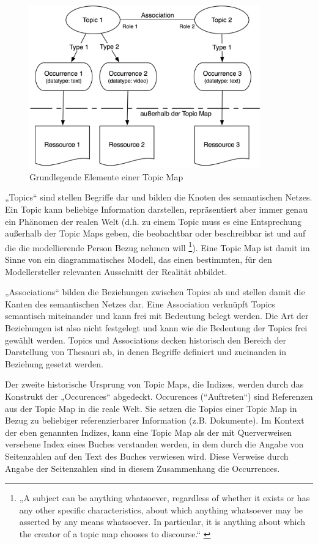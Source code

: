 \begin{figure}[htbp]
	\centering
		\includegraphics[width=10cm]{img/Persistenz/TMBasic.png}
	\caption{Grundlegende Elemente einer Topic Map}
	\label{fig:img_Persistenz_TMBasic}
\end{figure}

„Topics“ sind stellen Begriffe dar und bilden die Knoten des semantischen Netzes. Ein Topic kann beliebige Information darstellen, repräsentiert aber immer genau ein Phänomen der realen Welt (d.h. zu einem Topic muss es eine Entsprechung außerhalb der Topic Maps geben, die beobachtbar oder beschreibbar ist und auf die die modellierende Person Bezug nehmen will \footnote{„A subject can be anything whatsoever, regardless of whether it exists or has any other specific characteristics, about which anything whatsoever may be asserted by any means whatsoever. In particular, it is anything about which the creator of a topic map chooses to discourse.“ \citep[][S.8]{TMDM08}}). Eine Topic Map ist damit im Sinne von \citet{Stachowiak73} ein diagrammatisches Modell, das einen bestimmten, für den Modellersteller relevanten Ausschnitt der Realität abbildet.

„Associations“ bilden die Beziehungen zwischen Topics ab und stellen damit die Kanten des semantischen Netzes dar. Eine Association verknüpft Topics semantisch miteinander und kann frei mit Bedeutung belegt werden. Die Art der Beziehungen ist also nicht festgelegt und kann wie die Bedeutung der Topics frei gewählt werden. Topics und Associations decken historisch den Bereich der Darstellung von Thesauri ab, in denen Begriffe definiert und zueinanden in Beziehung gesetzt werden. 

Der zweite historische Ursprung von Topic Maps, die Indizes, werden durch das Konstrukt der „Occurences“ abgedeckt. Occurences (“Auftreten“) sind Referenzen aus der Topic Map in die reale Welt. Sie setzen die Topics einer Topic Map in Bezug zu beliebiger referenzierbarer Information (z.B. Dokumente). Im Kontext der eben genannten Indizes, kann eine Topic Map als der mit Querverweisen versehene Index eines Buches verstanden werden, in dem durch die Angabe von Seitenzahlen auf den Text des Buches verwiesen wird. Diese Verweise durch Angabe der Seitenzahlen sind in diesem Zusammenhang die Occurrences.

